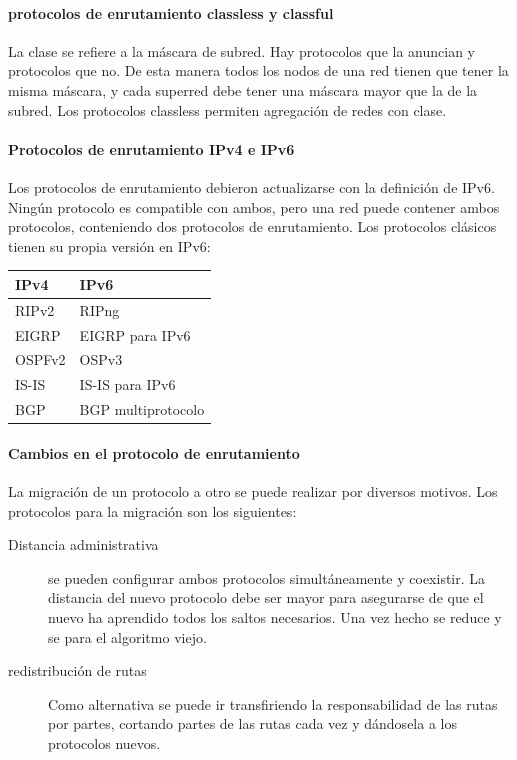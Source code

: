         \paragraph{protocolos de enrutamiento classless y classful}
            La clase se refiere a la máscara de subred. Hay protocolos que la anuncian y protocolos que no. De esta manera todos los nodos de una red tienen que tener la misma máscara, y cada superred debe tener una máscara mayor que la de la subred. Los protocolos classless permiten agregación de redes con clase.

        \paragraph{Protocolos de enrutamiento IPv4 e IPv6}
            Los protocolos de enrutamiento debieron actualizarse con la definición de IPv6. Ningún protocolo es compatible con ambos, pero una red puede contener ambos protocolos, conteniendo dos protocolos de enrutamiento. Los protocolos clásicos tienen su propia versión en IPv6:

            \begin{table}[H]
            \begin{tabular}{ll}
                IPv4   & IPv6               \\
                \midrule
                RIPv2  & RIPng              \\
                EIGRP  & EIGRP para IPv6    \\
                OSPFv2 & OSPv3              \\
                IS-IS  & IS-IS para IPv6    \\
                BGP    & BGP multiprotocolo \\
            \end{tabular}
            \end{table}

        \paragraph{Cambios en el protocolo de enrutamiento}
            La migración de un protocolo a otro se puede realizar por diversos motivos. Los protocolos para la migración son los siguientes:
            \begin{description}
                \item[Distancia administrativa] se pueden configurar ambos protocolos simultáneamente y coexistir. La distancia del nuevo protocolo debe ser mayor para asegurarse de que el nuevo ha aprendido todos los saltos necesarios. Una vez hecho se reduce y se para el algoritmo viejo.
                \item[redistribución de rutas] Como alternativa se puede ir transfiriendo la responsabilidad de las rutas por partes, cortando partes de las rutas cada vez y dándosela a los protocolos nuevos.
            \end{description}

